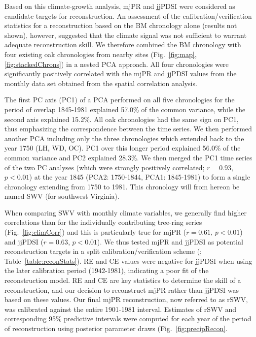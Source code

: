 Based on this climate-growth analysis, mjPR and jjPDSI were considered
as candidate targets for reconstruction. An assessment of the
calibration/verification statistics for a reconstruction based on the BM
chronology alone (results not shown), however, suggested that the climate
signal was not sufficient to warrant adequate reconstruction skill. We
therefore combined the BM chronology with four existing oak chronologies
from nearby sites (Fig.~\ref{fig:map}, \ref{fig:stackedChrons}) in a
nested PCA approach. All four chronologies were significantly positively
correlated with the mjPR and jjPDSI values from the monthly data set
obtained from the spatial correlation analysis. 

The first PC axis (PC1) of a PCA performed on all five chronologies
for the period of overlap 1845-1981 explained 57.0\% of the common
variance, while the second axis explained 15.2\%. All oak chronologies had
the same sign on PC1, thus emphasizing the correspondence between the
time series. We then performed another PCA including only the three
chronologies which extended back to the year 1750 (LH, WD, OC). PC1
over this longer period explained 56.0\% of the common variance and
PC2 explained 28.3\%. We then merged the PC1 time series of the two PC
analyses (which were strongly positively correlated; $r=0.93$, $p <
0.01$) at the year 1845 (PCA2: 1750-1844, PCA1: 1845-1981) to form a
single chronology extending from 1750 to 1981. This chronology will from
hereon be named SWV (for southwest Virginia).

When comparing SWV with monthly climate variables, we generally find
higher correlations than for the individually contributing tree-ring
series (Fig.~\ref{fig:climCorr}) and
this is particularly true for mjPR ($r=0.61$, $p<0.01$) and jjPDSI
($r=0.63$, $p<0.01$). We thus tested mjPR and jjPDSI as potential
reconstruction targets in a split calibration/verification scheme
(\cite{fritts1990methods}; Table~\ref{table:reconStats}). RE and CE
values were negative for jjPDSI when using the later calibration period
(1942-1981), indicating a poor fit of the reconstruction model. RE and
CE are key statistics to determine the skill of a reconstruction, and
our decision to reconstruct mjPR rather than jjPDSI was based on these
values. Our final mjPR reconstruction, now referred to as rSWV, was calibrated against the entire
1901-1981 interval. Estimates of rSWV and corresponding 95\% predictive intervals were computed for each year of the period of reconstruction using posterior parameter draws (Fig.~\ref{fig:precipRecon}.

